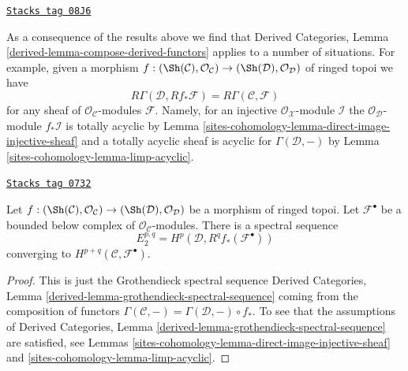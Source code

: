 \begin{remark}
\label{sites-cohomology-remark-before-Leray}
\href{https://stacks.math.columbia.edu/tag/08J6}{\texttt{Stacks tag 08J6}}

As a consequence of the results above we find that
Derived Categories, Lemma \ref{derived-lemma-compose-derived-functors}
applies to a number of situations. For example, given a
morphism $f : (\Sh(\mathcal{C}), \mathcal{O}_\mathcal{C}) \to
(\Sh(\mathcal{D}), \mathcal{O}_\mathcal{D})$ of ringed topoi we have
$$
R\Gamma(\mathcal{D}, Rf_*\mathcal{F}) = R\Gamma(\mathcal{C}, \mathcal{F})
$$
for any sheaf of $\mathcal{O}_\mathcal{C}$-modules $\mathcal{F}$.
Namely, for an injective $\mathcal{O}_\mathcal{X}$-module $\mathcal{I}$
the $\mathcal{O}_\mathcal{D}$-module $f_*\mathcal{I}$ is totally acyclic by
Lemma \ref{sites-cohomology-lemma-direct-image-injective-sheaf}
and a totally acyclic sheaf is acyclic for $\Gamma(\mathcal{D}, -)$ by
Lemma \ref{sites-cohomology-lemma-limp-acyclic}.
\end{remark}

\begin{lemma}

\label{sites-cohomology-lemma-Leray}
\href{https://stacks.math.columbia.edu/tag/0732}{\texttt{Stacks tag 0732}}

Let $f : (\Sh(\mathcal{C}), \mathcal{O}_\mathcal{C}) \to
(\Sh(\mathcal{D}), \mathcal{O}_\mathcal{D})$ be a morphism of ringed topoi.
Let $\mathcal{F}^\bullet$ be a bounded below complex of
$\mathcal{O}_\mathcal{C}$-modules. There is a spectral sequence
$$
E_2^{p, q} = H^p(\mathcal{D}, R^qf_*(\mathcal{F}^\bullet))
$$
converging to $H^{p + q}(\mathcal{C}, \mathcal{F}^\bullet)$.
\end{lemma}

\begin{proof}
This is just the Grothendieck spectral sequence
Derived Categories, Lemma \ref{derived-lemma-grothendieck-spectral-sequence}
coming from the composition of functors
$\Gamma(\mathcal{C}, -) = \Gamma(\mathcal{D}, -) \circ f_*$.
To see that the assumptions of
Derived Categories, Lemma \ref{derived-lemma-grothendieck-spectral-sequence}
are satisfied, see
Lemmas \ref{sites-cohomology-lemma-direct-image-injective-sheaf} and
\ref{sites-cohomology-lemma-limp-acyclic}.
\end{proof}

